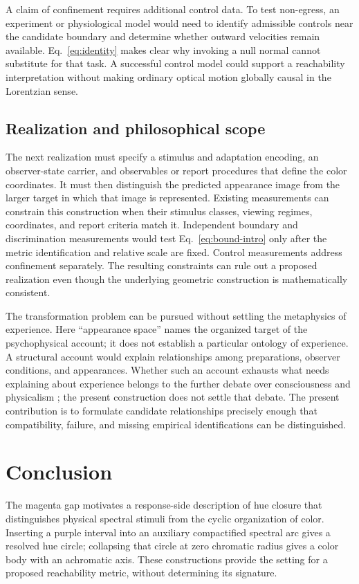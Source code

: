 \documentclass[11pt,letterpaper]{article}
\theoremstyle{plain}
\begin{document}
A claim of confinement requires additional control data. To test non-egress, an experiment or physiological model would need to identify admissible controls near the candidate boundary and determine whether outward velocities remain available. Eq.~\eqref{eq:identity} makes clear why invoking a null normal cannot substitute for that task. A successful control model could support a reachability interpretation without making ordinary optical motion globally causal in the Lorentzian sense.

\subsection{Realization and philosophical scope}
The next realization must specify a stimulus and adaptation encoding, an observer-state carrier, and observables or report procedures that define the color coordinates. It must then distinguish the predicted appearance image from the larger target in which that image is represented. Existing measurements can constrain this construction when their stimulus classes, viewing regimes, coordinates, and report criteria match it. Independent boundary and discrimination measurements would test Eq.~\eqref{eq:bound-intro} only after the metric identification and relative scale are fixed. Control measurements address confinement separately. The resulting constraints can rule out a proposed realization even though the underlying geometric construction is mathematically consistent.

The transformation problem can be pursued without settling the metaphysics of experience. Here ``appearance space'' names the organized target of the psychophysical account; it does not establish a particular ontology of experience. A structural account would explain relationships among preparations, observer conditions, and appearances. Whether such an account exhausts what needs explaining about experience belongs to the further debate over consciousness and physicalism \cite{Chalmers2010,Stoljar2010}; the present construction does not settle that debate. The present contribution is to formulate candidate relationships precisely enough that compatibility, failure, and missing empirical identifications can be distinguished.

\section{Conclusion}
The magenta gap motivates a response-side description of hue closure that distinguishes physical spectral stimuli from the cyclic organization of color. Inserting a purple interval into an auxiliary compactified spectral arc gives a resolved hue circle; collapsing that circle at zero chromatic radius gives a color body with an achromatic axis. These constructions provide the setting for a proposed reachability metric, without determining its signature.
\end{document}
